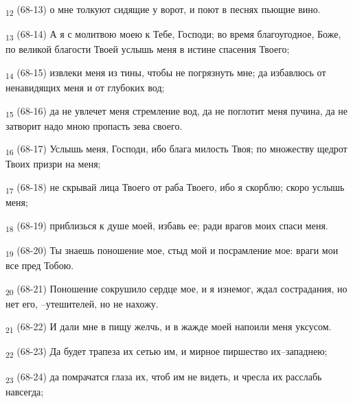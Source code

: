 \begin{tcolorbox}
\textsubscript{12} (68-13) о мне толкуют сидящие у ворот, и поют в песнях пьющие вино.
\end{tcolorbox}
\begin{tcolorbox}
\textsubscript{13} (68-14) А я с молитвою моею к Тебе, Господи; во время благоугодное, Боже, по великой благости Твоей услышь меня в истине спасения Твоего;
\end{tcolorbox}
\begin{tcolorbox}
\textsubscript{14} (68-15) извлеки меня из тины, чтобы не погрязнуть мне; да избавлюсь от ненавидящих меня и от глубоких вод;
\end{tcolorbox}
\begin{tcolorbox}
\textsubscript{15} (68-16) да не увлечет меня стремление вод, да не поглотит меня пучина, да не затворит надо мною пропасть зева своего.
\end{tcolorbox}
\begin{tcolorbox}
\textsubscript{16} (68-17) Услышь меня, Господи, ибо блага милость Твоя; по множеству щедрот Твоих призри на меня;
\end{tcolorbox}
\begin{tcolorbox}
\textsubscript{17} (68-18) не скрывай лица Твоего от раба Твоего, ибо я скорблю; скоро услышь меня;
\end{tcolorbox}
\begin{tcolorbox}
\textsubscript{18} (68-19) приблизься к душе моей, избавь ее; ради врагов моих спаси меня.
\end{tcolorbox}
\begin{tcolorbox}
\textsubscript{19} (68-20) Ты знаешь поношение мое, стыд мой и посрамление мое: враги мои все пред Тобою.
\end{tcolorbox}
\begin{tcolorbox}
\textsubscript{20} (68-21) Поношение сокрушило сердце мое, и я изнемог, ждал сострадания, но нет его, --утешителей, но не нахожу.
\end{tcolorbox}
\begin{tcolorbox}
\textsubscript{21} (68-22) И дали мне в пищу желчь, и в жажде моей напоили меня уксусом.
\end{tcolorbox}
\begin{tcolorbox}
\textsubscript{22} (68-23) Да будет трапеза их сетью им, и мирное пиршество их--западнею;
\end{tcolorbox}
\begin{tcolorbox}
\textsubscript{23} (68-24) да помрачатся глаза их, чтоб им не видеть, и чресла их расслабь навсегда;
\end{tcolorbox}
